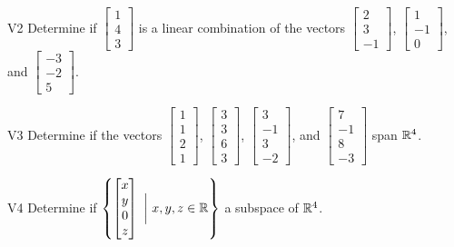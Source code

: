\documentclass{sbgLAsemi}
\begin{document}
\begin{problem}{V2}
Determine if $\begin{bmatrix} 1 \\ 4 \\ 3 \end{bmatrix}$ is a linear combination of the vectors $\begin{bmatrix} 2 \\ 3 \\ -1 \end{bmatrix}$, $\begin{bmatrix} 1 \\ -1 \\ 0 \end{bmatrix}$, and $\begin{bmatrix} -3 \\ -2 \\ 5 \end{bmatrix}$.
\end{problem}

\begin{problem}{V3}
Determine if the vectors $\begin{bmatrix} 1 \\ 1 \\ 2 \\1 \end{bmatrix}$, $\begin{bmatrix} 3 \\ 3 \\ 6 \\ 3 \end{bmatrix}$, $\begin{bmatrix}3 \\ -1 \\ 3 \\ -2\end{bmatrix}$, and $\begin{bmatrix} 7 \\ -1 \\ 8 \\ -3 \end{bmatrix}$  span $\mathbb{R}^4$.
\end{problem}

\begin{problem}{V4}
Determine if $\left\{ \begin{bmatrix} x \\ y \\ 0 \\ z \end{bmatrix}\  \bigg|\ x,y,z \in \mathbb{R}\right\}$  a subspace of $\mathbb{R}^4$.
\end{problem}
\end{document}
